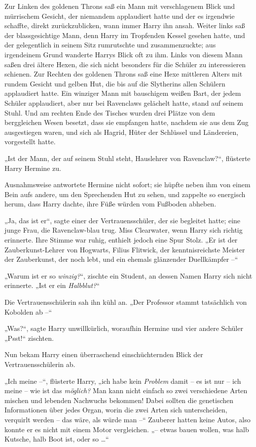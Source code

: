{Zur Linken des goldenen Throns saß ein Mann mit verschlagenem Blick und mürrischem Gesicht, der niemandem applaudiert hatte und der es irgendwie schaffte, direkt zurückzublicken, wann immer Harry ihn ansah. Weiter links saß der blassgesichtige Mann, denn Harry im Tropfenden Kessel gesehen hatte, und der gelegentlich in seinem Sitz rumrutschte und zusammenzuckte; aus irgendeinem Grund wanderte Harrys Blick oft zu ihm. Links von diesem Mann saßen drei ältere Hexen, die sich nicht besonders für die Schüler zu interessieren schienen. Zur Rechten des goldenen Throns saß eine Hexe mittleren Alters mit rundem Gesicht und gelben Hut, die bis auf die Slytherins allen Schülern applaudiert hatte. Ein winziger Mann mit bauschigem weißen Bart, der jedem Schüler applaudiert, aber nur bei Ravenclaws gelächelt hatte, stand auf seinem Stuhl. Und am rechten Ende des Tisches wurden drei Plätze von dem berggleichen Wesen besetzt, dass sie empfangen hatte, nachdem sie aus dem Zug ausgestiegen waren, und sich als Hagrid, Hüter der Schlüssel und Ländereien, vorgestellt hatte.

„Ist der Mann, der auf seinem Stuhl steht, Hauslehrer von Ravenclaw?“, flüsterte Harry Hermine zu.

Ausnahmsweise antwortete Hermine nicht sofort; sie hüpfte neben ihm von einem Bein aufs andere, um den Sprechenden Hut zu sehen, und zappelte so energisch herum, dass Harry dachte, ihre Füße würden vom Fußboden abheben.

„Ja, das ist er“, sagte einer der Vertrauensschüler, der sie begleitet hatte; eine junge Frau, die Ravenclaw-blau trug. Miss Clearwater, wenn Harry sich richtig erinnerte. Ihre Stimme war ruhig, enthielt jedoch eine Spur Stolz. „Er ist der Zauberkunst-Lehrer von Hogwarts, Filius Flitwick, der kenntnisreichste Meister der Zauberkunst, der noch lebt, und ein ehemals glänzender Duellkämpfer --“

„Warum ist er so \emph{winzig?}“, zischte ein Student, an dessen Namen Harry sich nicht erinnerte. „Ist er ein \emph{Halbblut?}“

Die Vertrauensschülerin sah ihn kühl an. „Der Professor stammt tatsächlich von Kobolden ab --“

„Was?“, sagte Harry unwillkürlich, woraufhin Hermine und vier andere Schüler „Psst!“ zischten.

Nun bekam Harry einen überraschend einschüchternden Blick der Vertrauensschülerin ab.

„Ich meine --“, flüsterte Harry, „ich habe kein \emph{Problem} damit -- es ist nur -- ich meine -- wie ist das \emph{möglich?} Man kann nicht einfach so zwei verschiedene Arten mischen und lebenden Nachwuchs bekommen! Dabei sollten die genetischen Informationen über jedes Organ, worin die zwei Arten sich unterscheiden, verquirlt werden -- das wäre, als würde man --“ Zauberer hatten keine Autos, also konnte er es nicht mit einem Motor vergleichen. „-- etwas bauen wollen, was halb Kutsche, halb Boot ist, oder so …“

}
